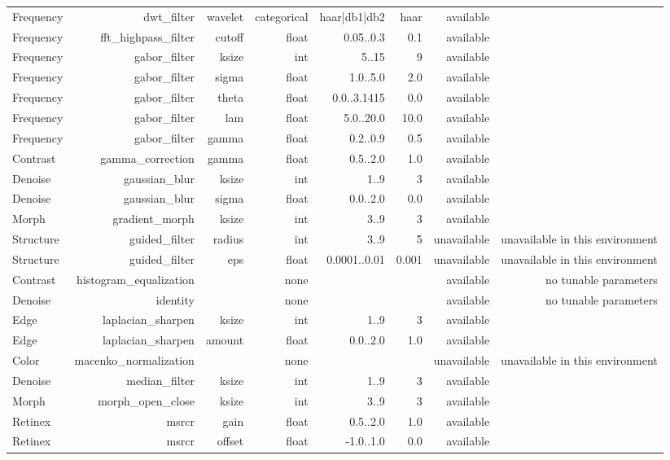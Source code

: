 \begin{tabular}{lrrrrrrr}
Frequency & dwt\_filter & wavelet & categorical & haar|db1|db2 & haar & available &  \\
Frequency & fft\_highpass\_filter & cutoff & float & 0.05..0.3 & 0.1 & available &  \\
Frequency & gabor\_filter & ksize & int & 5..15 & 9 & available &  \\
Frequency & gabor\_filter & sigma & float & 1.0..5.0 & 2.0 & available &  \\
Frequency & gabor\_filter & theta & float & 0.0..3.1415 & 0.0 & available &  \\
Frequency & gabor\_filter & lam & float & 5.0..20.0 & 10.0 & available &  \\
Frequency & gabor\_filter & gamma & float & 0.2..0.9 & 0.5 & available &  \\
Contrast & gamma\_correction & gamma & float & 0.5..2.0 & 1.0 & available &  \\
Denoise & gaussian\_blur & ksize & int & 1..9 & 3 & available &  \\
Denoise & gaussian\_blur & sigma & float & 0.0..2.0 & 0.0 & available &  \\
Morph & gradient\_morph & ksize & int & 3..9 & 3 & available &  \\
Structure & guided\_filter & radius & int & 3..9 & 5 & unavailable & unavailable in this environment \\
Structure & guided\_filter & eps & float & 0.0001..0.01 & 0.001 & unavailable & unavailable in this environment \\
Contrast & histogram\_equalization &  & none &  &  & available & no tunable parameters \\
Denoise & identity &  & none &  &  & available & no tunable parameters \\
Edge & laplacian\_sharpen & ksize & int & 1..9 & 3 & available &  \\
Edge & laplacian\_sharpen & amount & float & 0.0..2.0 & 1.0 & available &  \\
Color & macenko\_normalization &  & none &  &  & unavailable & unavailable in this environment \\
Denoise & median\_filter & ksize & int & 1..9 & 3 & available &  \\
Morph & morph\_open\_close & ksize & int & 3..9 & 3 & available &  \\
Retinex & msrcr & gain & float & 0.5..2.0 & 1.0 & available &  \\
Retinex & msrcr & offset & float & -1.0..1.0 & 0.0 & available &  \\

\end{tabular}

